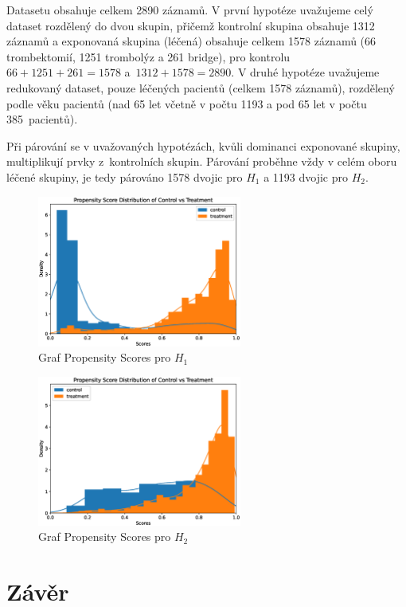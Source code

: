Datasetu obsahuje celkem 2890 záznamů.
V první hypotéze uvažujeme celý dataset rozdělený do dvou skupin, přičemž kontrolní skupina obsahuje 1312 záznamů a exponovaná skupina (léčená) obsahuje celkem 1578 záznamů (66 trombektomií, 1251 trombolýz a 261 bridge), pro kontrolu \( 66 + 1251 + 261 = 1578 \) a~\( 1312 + 1578 = 2890 \).
V druhé hypotéze uvažujeme redukovaný dataset, pouze léčených pacientů (celkem 1578 záznamů), rozdělený podle věku pacientů (nad 65 let včetně v počtu 1193 a pod 65 let v počtu 385~pacientů).

Při párování se v uvažovaných hypotézách, kvůli dominanci exponované skupiny, multiplikují prvky z~kontrolních skupin.
Párování proběhne vždy v celém oboru léčené skupiny, je tedy párováno 1578 dvojic pro \( H_1 \) a 1193 dvojic pro \( H_2 \).

\begin{figure}[htbp]
	\centering
	\includegraphics[width=0.6\textwidth]{graphs/h1.eps}
	\caption{Graf Propensity Scores pro \( H_1 \)}
\end{figure}
\FloatBarrier

\begin{figure}[htbp]
	\centering
	\includegraphics[width=0.6\textwidth]{graphs/h2.eps}
	\caption{Graf Propensity Scores pro \( H_2 \)}
\end{figure}
\FloatBarrier

\section{Závěr}

